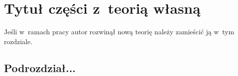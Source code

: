 \chapter{Tytuł części z~teorią własną}\label{chap:nowa_teoria}
Jeśli w~ramach pracy autor rozwinął nową teorię należy zamieścić ją w~tym rozdziale.

\section{Podrozdział...}